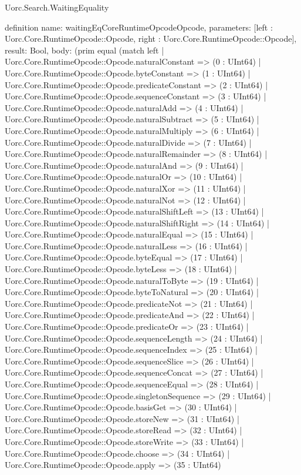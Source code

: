 \begin{lexlean}{Uorc.Search.WaitingEquality}
\begin{semanticmodule}
definition{
  name: waitingEqCoreRuntimeOpcodeOpcode,
  parameters: [left : Uorc.Core.RuntimeOpcode::Opcode, right : Uorc.Core.RuntimeOpcode::Opcode],
  result: Bool,
  body: (prim equal (match left
    | Uorc.Core.RuntimeOpcode::Opcode.naturalConstant => (0 : UInt64)
    | Uorc.Core.RuntimeOpcode::Opcode.byteConstant => (1 : UInt64)
    | Uorc.Core.RuntimeOpcode::Opcode.predicateConstant => (2 : UInt64)
    | Uorc.Core.RuntimeOpcode::Opcode.sequenceConstant => (3 : UInt64)
    | Uorc.Core.RuntimeOpcode::Opcode.naturalAdd => (4 : UInt64)
    | Uorc.Core.RuntimeOpcode::Opcode.naturalSubtract => (5 : UInt64)
    | Uorc.Core.RuntimeOpcode::Opcode.naturalMultiply => (6 : UInt64)
    | Uorc.Core.RuntimeOpcode::Opcode.naturalDivide => (7 : UInt64)
    | Uorc.Core.RuntimeOpcode::Opcode.naturalRemainder => (8 : UInt64)
    | Uorc.Core.RuntimeOpcode::Opcode.naturalAnd => (9 : UInt64)
    | Uorc.Core.RuntimeOpcode::Opcode.naturalOr => (10 : UInt64)
    | Uorc.Core.RuntimeOpcode::Opcode.naturalXor => (11 : UInt64)
    | Uorc.Core.RuntimeOpcode::Opcode.naturalNot => (12 : UInt64)
    | Uorc.Core.RuntimeOpcode::Opcode.naturalShiftLeft => (13 : UInt64)
    | Uorc.Core.RuntimeOpcode::Opcode.naturalShiftRight => (14 : UInt64)
    | Uorc.Core.RuntimeOpcode::Opcode.naturalEqual => (15 : UInt64)
    | Uorc.Core.RuntimeOpcode::Opcode.naturalLess => (16 : UInt64)
    | Uorc.Core.RuntimeOpcode::Opcode.byteEqual => (17 : UInt64)
    | Uorc.Core.RuntimeOpcode::Opcode.byteLess => (18 : UInt64)
    | Uorc.Core.RuntimeOpcode::Opcode.naturalToByte => (19 : UInt64)
    | Uorc.Core.RuntimeOpcode::Opcode.byteToNatural => (20 : UInt64)
    | Uorc.Core.RuntimeOpcode::Opcode.predicateNot => (21 : UInt64)
    | Uorc.Core.RuntimeOpcode::Opcode.predicateAnd => (22 : UInt64)
    | Uorc.Core.RuntimeOpcode::Opcode.predicateOr => (23 : UInt64)
    | Uorc.Core.RuntimeOpcode::Opcode.sequenceLength => (24 : UInt64)
    | Uorc.Core.RuntimeOpcode::Opcode.sequenceIndex => (25 : UInt64)
    | Uorc.Core.RuntimeOpcode::Opcode.sequenceSlice => (26 : UInt64)
    | Uorc.Core.RuntimeOpcode::Opcode.sequenceConcat => (27 : UInt64)
    | Uorc.Core.RuntimeOpcode::Opcode.sequenceEqual => (28 : UInt64)
    | Uorc.Core.RuntimeOpcode::Opcode.singletonSequence => (29 : UInt64)
    | Uorc.Core.RuntimeOpcode::Opcode.basisGet => (30 : UInt64)
    | Uorc.Core.RuntimeOpcode::Opcode.storeNew => (31 : UInt64)
    | Uorc.Core.RuntimeOpcode::Opcode.storeRead => (32 : UInt64)
    | Uorc.Core.RuntimeOpcode::Opcode.storeWrite => (33 : UInt64)
    | Uorc.Core.RuntimeOpcode::Opcode.choose => (34 : UInt64)
    | Uorc.Core.RuntimeOpcode::Opcode.apply => (35 : UInt64)
}
\end{semanticmodule}
\end{lexlean}
